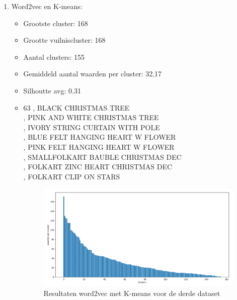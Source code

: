 \begin{enumerate}
    \item Word2vec en K-means:
    \begin{itemize}
        \item Grootste cluster: 168
        \item Grootte vuilniscluster: 168
        \item Aantal clusters: 155
        \item Gemiddeld aantal waarden per cluster: 32,17
        \item Silhoutte avg:  0.31
        \item 63 , BLACK CHRISTMAS TREE
        \\ , PINK AND WHITE CHRISTMAS TREE
        \\ , IVORY STRING CURTAIN WITH POLE
        \\ , BLUE FELT HANGING HEART W FLOWER
        \\ , PINK FELT HANGING HEART W FLOWER
        \\ , SMALLFOLKART BAUBLE CHRISTMAS DEC
        \\ , FOLKART ZINC HEART CHRISTMAS DEC
        \\ , FOLKART CLIP ON STARS
        \begin{figure}[h]
            \centering
            \includegraphics[width=0.7\linewidth]{../foto's/retailword2veckmeans}
            \caption{Resultaten word2vec met K-means voor de derde dataset}
            \label{fig:dataset3_word2vec_kmeans}
        \end{figure}
    \end{itemize}
    \newpage


\end{enumerate}
